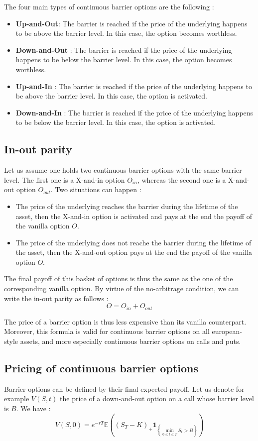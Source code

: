 \documentclass[a4paper,11pt,english]{book}
\begin{document}
The four main types of continuous barrier options are the following :
\begin{itemize}
    \item \textbf{Up-and-Out}: The barrier is reached if the price of the underlying happens to be above the barrier level. In this case, the option becomes worthless.
    \item \textbf{Down-and-Out} : The barrier is reached if the price of the underlying happens to be below the barrier level. In this case, the option becomes worthless.
    \item \textbf{Up-and-In} : The barrier is reached if the price of the underlying happens to be above the barrier level. In this case, the option is activated.
    \item \textbf{Down-and-In} : The barrier is reached if the price of the underlying happens to be below the barrier level. In this case, the option is activated.
\end{itemize}

\subsection{In-out parity}
Let us assume one holds two continuous barrier options with the same barrier level. The first one is a X-and-in option $O_{in}$, whereas the second one is a X-and-out option $O_{out}$. Two situations can happen : 
\begin{itemize}
    \item The price of the underlying reaches the barrier during the lifetime of the asset, then the X-and-in option is activated and pays at the end the payoff of the vanilla option $O$.
    \item The price of the underlying does not reache the barrier during the lifetime of the asset, then the X-and-out option pays at the end the payoff of the vanilla option $O$.
\end{itemize}

The final payoff of this basket of options is thus the same as the one of the corresponding vanilla option. By virtue of the no-arbitrage condition, we can write the in-out parity as follows : 
$$O = O_{in} + O_{out}$$

The price of a barrier option is thus less expensive than its vanilla counterpart. Moreover, this formula is valid for continuous barrier options on all european-style assets, and more especially continuous barrier options on calls and puts.

\subsection{Pricing of continuous barrier options}
Barrier options can be defined by their final expected payoff. Let us denote for example $V(S,t)$ the price of a down-and-out option on a call whose barrier level is $B$. We have : 
$$V(S,0) = e^{-rT}\mathbb{E}((S_T-K)_+\mathbf{1}_{\left\{\underset{0 \leq t \leq T}{\min} S_t>B\right\}})$$
\end{document}
